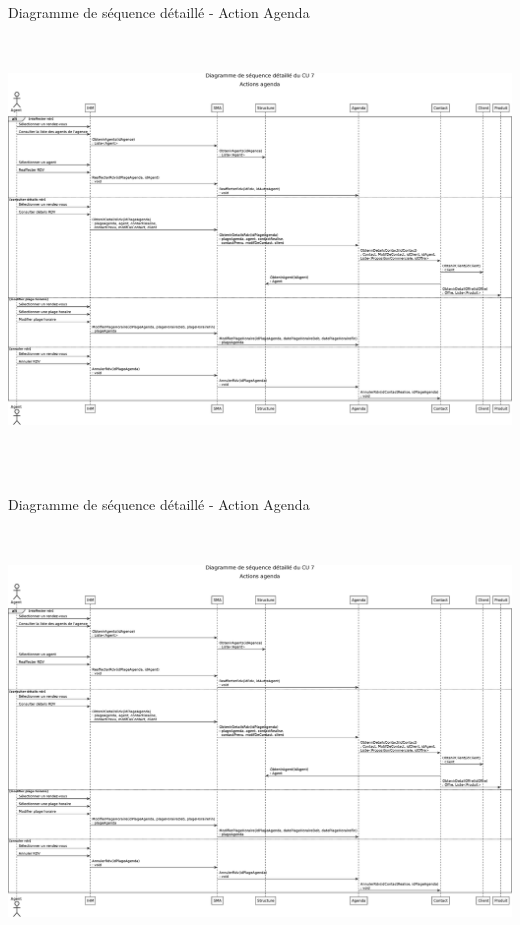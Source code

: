 \documentclass[xetex]{beamer}
\begin{document}
    \begin{frame}{Diagramme de séquence détaillé - Action Agenda}
  {\includegraphics[height=12cm]{../report/figures/eps/DSD_CU7_ActionsAgenda}}
    \end{frame}
    
     \begin{frame}{Diagramme de séquence détaillé - Action Agenda}
  {\includegraphics[height=12cm]{../report/figures/eps/DSD_CU7_ActionsAgenda}}
    \end{frame}
    
\end{document}
